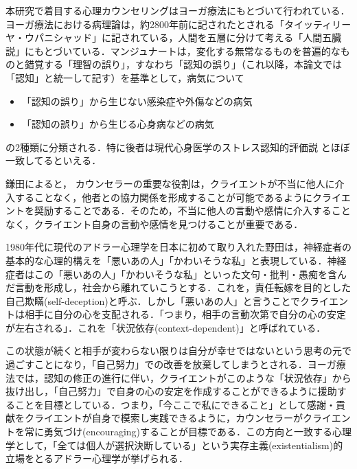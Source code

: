 \documentclass[shuuron]{kuee}
\begin{document}
本研究で着目する心理カウンセリングはヨーガ療法にもとづいて行われている．ヨーガ療法における病理論は，約2800年前に記されたとされる「タイッティリーヤ・ウパニシャッド」に記されている，人間を五層に分けて考える「人間五臓説」にもとづいている\cite{kimura}．マンジュナート\cite{manjunath}は，変化する無常なるものを普遍的なものと錯覚する「理智の誤り」，すなわち「認知の誤り」（これ以降，本論文では「認知」と統一して記す）を基準として，病気について
\begin{itemize}
  \item 「認知の誤り」から生じない感染症や外傷などの病気
  \item 「認知の誤り」から生じる心身病などの病気
\end{itemize}
の2種類に分類される．特に後者は現代心身医学のストレス認知的評価説%
\cite{Lazarus}とほぼ一致してるといえる\cite{Darshana}．


鎌田\cite{kamata2002}によると， カウンセラーの重要な役割は，クライエントが不当に他人に介入することなく，他者との協力関係を形成することが可能であるようにクライエントを奨励することである．そのため，不当に他人の言動や感情に介入することなく，クライエント自身の言動や感情を見つけることが重要である．

1980年代に現代のアドラー心理学を日本に初めて取り入れた野田\cite{zokad}は，神経症者の基本的な心理的構えを「悪いあの人」「かわいそうな私」と表現している．神経症者はこの「悪いあの人」「かわいそうな私」といった文句・批判・愚痴を含んだ言動を形成し，社会から離れていこうとする．これを，責任転嫁を目的とした自己欺瞞(self-deception)と呼ぶ\cite{Darshana}．しかし「悪いあの人」と言うことでクライエントは相手に自分の心を支配される．「つまり，相手の言動次第で自分の心の安定が左右される」．これを「状況依存(context-dependent)」と呼ばれている．

この状態が続くと相手が変わらない限りは自分が幸せではないという思考の元で過ごすことになり，「自己努力」での改善を放棄してしまうとされる\cite{zokad}．ヨーガ療法では，認知の修正の進行に伴い，クライエントがこのような「状況依存」から抜け出し，「自己努力」で自身の心の安定を作成することができるように援助することを目標としている．つまり，「今ここで私にできること」として感謝・貢献をクライエントが自身で模索し実践できるように，カウンセラーがクライエントを常に勇気づけ(encouraging)することが目標である．この方向と一致する心理学として，「全ては個人が選択決断している」という実存主義(existentialism)的立場をとるアドラー心理学が挙げられる．
\end{document}
